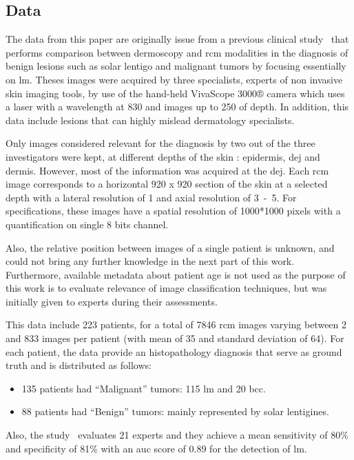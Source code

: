 \documentclass[journal,article,submit,moreauthors,pdftex, applsci]{Definitions/mdpi}
\begin{document}
\subsection{Data}
\label{sec:data}
The data from this paper are originally issue from a previous clinical study~\cite{Cinotti2018} that performs comparison between dermoscopy and \ac{rcm} modalities in the diagnosis of benign lesions such as solar lentigo and malignant tumors by focusing essentially on \ac{lm}. Theses images were acquired by three specialists, experts of non invasive skin imaging tools, by use of the hand-held VivaScope 3000® camera which uses a laser with a wavelength at \unit{830}{\nano\meter} and images up to \unit{250}{\micro\meter} of depth. In addition, this data include lesions that can highly mislead dermatology specialists.\par
Only images considered relevant for the diagnosis by two out of the three investigators were kept, at different depths of the skin : epidermis, \ac{dej} and dermis. However, most of the information was acquired at the \ac{dej}. Each \ac{rcm} image corresponds to a horizontal \unit{920}{\micro\meter} x \unit{920}{\micro\meter} section of the skin at a selected depth with a lateral resolution of \unit{1}{\micro\meter} and axial resolution of \unit{3-5}{\micro\meter}. For specifications, these images have a spatial resolution of 1000*1000 pixels with a quantification on single 8 bits channel.\par
Also, the relative position between images of a single patient is unknown, and could not bring any further knowledge in the next part of this work. Furthermore, available metadata about patient age is not used as the purpose of this work is to evaluate relevance of image classification techniques, but was initially given to experts during their assessments.\par
This data include 223 patients, for a total of 7846 \ac{rcm} images varying between 2 and 833 images per patient (with mean of 35 and standard deviation of 64). For each patient, the data provide an histopathology diagnosis that serve as ground truth and is distributed as follows:
\begin{itemize}  
\item 135 patients had “Malignant” tumors: 115 \ac{lm} and 20 \ac{bcc}.
\item 88 patients had “Benign” tumors: mainly represented by solar lentigines.
\end{itemize}
Also, the study~\cite{Cinotti2018} evaluates 21 experts and they achieve a mean sensitivity of 80\% and specificity of 81\% with an \ac{auc} score of 0.89 for the detection of \ac{lm}.\par
\end{document}
